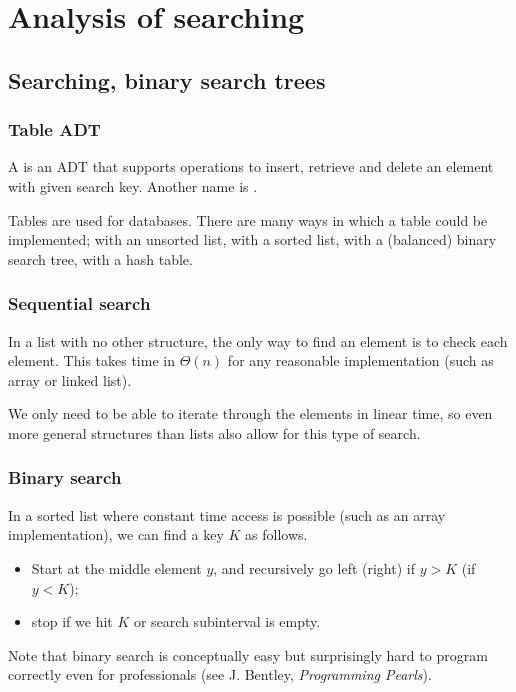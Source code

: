 \part{Analysis of searching}  
\label{ch:effsearch}

\chapter{Searching, binary search trees} %

\section{Table ADT}
\begin{Definition}
A  is an ADT that supports operations to insert, retrieve and delete an element
with given search key. Another name is .
\end{Definition}
Tables are used for databases. There are  many ways in which a table could be implemented;
with an unsorted list, with a sorted list, with a (balanced) binary search tree, with a hash table.

\section{Sequential search}
In a list with no other structure, the only way to find an element is to check each element. 
This takes time in $\Theta(n)$ for any reasonable implementation (such as array or linked list).

We only need to be able to iterate through the elements in linear time, 
so even more general structures than lists also allow for this type of search.

\section{Binary search}
In a sorted list where constant time access is possible (such as an array implementation), 
we can find a key $K$ as follows.
\begin{itemize}
  \item Start at the middle element $y$, and recursively go left (right) if $y > K$ (if $y < K$);
  \item stop if we hit  $K$ or search subinterval is empty.
\end{itemize}

Note that binary search is conceptually easy but surprisingly hard to program
correctly even for professionals (see J. Bentley, \emph{Programming Pearls}).

